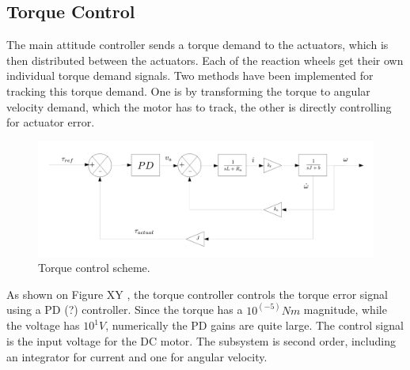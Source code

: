 \subsection{Torque Control}

The main attitude controller sends a torque demand to the actuators, which is then distributed between the actuators. Each of the reaction wheels get their own individual torque demand signals. Two methods have been implemented for tracking this torque demand. One is by transforming the torque to angular velocity demand, which the motor has to track, the other is directly controlling for actuator error.

\begin{figure}[h!]
	\centering 
	\includegraphics[width=170mm]{figures/torqueControl.pdf}	
	\caption{Torque control scheme.}
	\label{label{fig:frames}}
\end{figure}

As shown on Figure XY , the torque controller controls the torque error signal using a PD (?) controller. Since the torque has a $ 10^(-5) Nm$ magnitude, while the voltage has $ 10^1 V$, numerically the PD gains are quite large. The control signal is the input voltage for the DC motor. The subsystem is second order, including an integrator for current and one for angular velocity.
